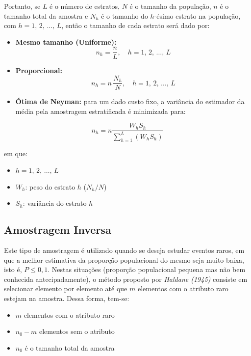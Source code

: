 \documentclass[
]{estat/estat}
\providecommand{\tightlist}{%
  \setlength{\itemsep}{0pt}\setlength{\parskip}{0pt}}\usepackage{longtable,booktabs,array}
\begin{document}
Portanto, se \(L\) é o número de estratos, \(N\) é o tamanho da
população, \(n\) é o tamanho total da amostra e \(N_h\) é o tamanho do
\(h\)-ésimo estrato na população, com \(h=1, \, 2, \, \ldots, \, L\),
então o tamanho de cada estrato será dado por:

\begin{itemize}
\tightlist
\item
  \textbf{Mesmo tamanho (Uniforme):} \[
  n_h = \frac{n}{L} , \quad h=1, \, 2, \, \ldots, \, L 
  \]
\item
  \textbf{Proporcional:} \[
  n_h = n \, \frac{N_h}{N} , \quad h=1, \, 2, \, \ldots, \, L 
  \]
\item
  \textbf{Ótima de Neyman:} para um dado custo fixo, a variância do
  estimador da média pela amostragem estratificada é minimizada para:
\end{itemize}

\[
n_h = n \frac{W_h S_h}{\sum_{h=1}^{L} (W_h S_h)}
\]

em que:

\begin{itemize}
\tightlist
\item
  \(h=1, \, 2, \, \ldots, \, L\)
\item
  \(W_h\): peso do estrato \(h\) (\(N_h/N\))
\item
  \(S_h\): variância do estrato \(h\)
\end{itemize}

\subsection{Amostragem Inversa}\label{amostragem-inversa}

Este tipo de amostragem é utilizado quando se deseja estudar eventos
raros, em que a melhor estimativa da proporção populacional do mesmo
seja muito baixa, isto é, \(P \leq 0,1\). Nestas situações (proporção
populacional pequena mas não bem conhecida antecipadamente), o método
proposto por \emph{Haldane (1945)} consiste em selecionar elemento por
elemento até que \(m\) elementos com o atributo raro estejam na amostra.
Dessa forma, tem-se:

\begin{itemize}
\tightlist
\item
  \(m\) elementos com o atributo raro
\item
  \(n_0 - m\) elementos sem o atributo
\item
  \(n_0\) é o tamanho total da amostra
\end{itemize}
\end{document}
